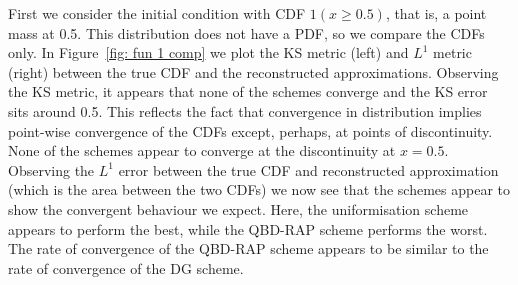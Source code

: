 \begin{example}\label{ex: exa}
	First we consider the initial condition with CDF \(1(x\geq 0.5)\), that is, a point mass at 0.5. This distribution does not have a PDF, so we compare the CDFs only. In Figure~\ref{fig: fun 1 comp} we plot the KS metric (left) and \(L^1\) metric (right) between the true CDF and the reconstructed approximations. Observing the KS metric, it appears that none of the schemes converge and the KS error sits around 0.5. This reflects the fact that convergence in distribution implies point-wise convergence of the CDFs except, perhaps, at points of discontinuity. None of the schemes appear to converge at the discontinuity at \(x=0.5\). Observing the \(L^1\) error between the true CDF and reconstructed approximation (which is the area between the two CDFs) we now see that the schemes appear to show the convergent behaviour we expect. Here, the uniformisation scheme appears to perform the best, while the QBD-RAP scheme performs the worst. The rate of convergence of the QBD-RAP scheme appears to be similar to the rate of convergence of the DG scheme. 


\end{example}
